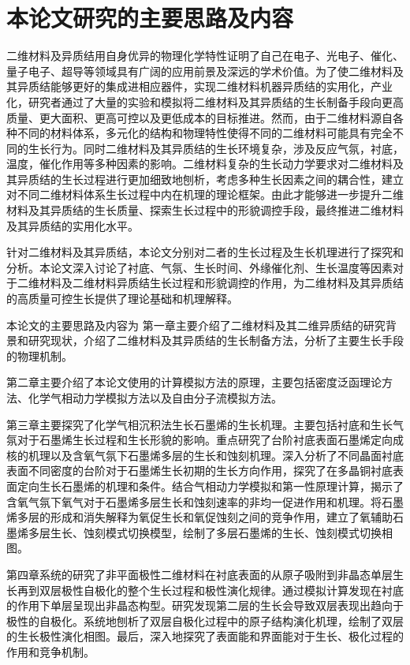 \section{本论文研究的主要思路及内容}
    二维材料及异质结用自身优异的物理化学特性证明了自己在电子、光电子、催化、量子电子、超导等领域具有广阔的应用前景及深远的学术价值。为了使二维材料及其异质结能够更好的集成进相应器件，实现二维材料机器异质结的实用化，产业化，研究者通过了大量的实验和模拟将二维材料及其异质结的生长制备手段向更高质量、更大面积、更高可控以及更低成本的目标推进。然而，由于二维材料源自各种不同的材料体系，多元化的结构和物理特性使得不同的二维材料可能具有完全不同的生长行为。同时二维材料及其异质结的生长环境复杂，涉及反应气氛，衬底，温度，催化作用等多种因素的影响。二维材料复杂的生长动力学要求对二维材料及其异质结的生长过程进行更加细致地刨析，考虑多种生长因素之间的耦合性，建立对不同二维材料体系生长过程中内在机理的理论框架。由此才能够进一步提升二维材料及其异质结的生长质量、探索生长过程中的形貌调控手段，最终推进二维材料及其异质结的实用化水平。

    针对二维材料及其异质结，本论文分别对二者的生长过程及生长机理进行了探究和分析。本论文深入讨论了衬底、气氛、生长时间、外缘催化剂、生长温度等因素对于二维材料及二维材料异质结生长过程和形貌调控的作用，为二维材料及其异质结的高质量可控生长提供了理论基础和机理解释。

    本论文的主要思路及内容为\chinesecolon
    第一章主要介绍了二维材料及其二维异质结的研究背景和研究现状，介绍了二维材料及其异质结的生长制备方法，分析了主要生长手段的物理机制。

    第二章主要介绍了本论文使用的计算模拟方法的原理，主要包括密度泛函理论方法、化学气相动力学模拟方法以及自由分子流模拟方法。

    第三章主要探究了化学气相沉积法生长石墨烯的生长机理。主要包括衬底和生长气氛对于石墨烯生长过程和生长形貌的影响。重点研究了台阶衬底表面石墨烯定向成核的机理以及含氧气氛下石墨烯多层的生长和蚀刻机理。深入分析了不同晶面衬底表面不同密度的台阶对于石墨烯生长初期的生长方向作用，探究了在多晶铜衬底表面定向生长石墨烯的机理和条件。结合气相动力学模拟和第一性原理计算，揭示了含氧气氛下氧气对于石墨烯多层生长和蚀刻速率的非均一促进作用和机理。将石墨烯多层的形成和消失解释为氧促生长和氧促蚀刻之间的竞争作用，建立了氧辅助石墨烯多层生长、蚀刻模式切换模型，绘制了多层石墨烯的生长、蚀刻模式切换相图。

    第四章系统的研究了非平面极性二维材料在衬底表面的从原子吸附到非晶态单层生长再到双层极性自极化的整个生长过程和极性演化规律。通过模拟计算发现在衬底的作用下单层呈现出非晶态构型。研究发现第二层的生长会导致双层表现出趋向于极性的自极化。系统地刨析了双层自极化过程中的原子结构演化机理，绘制了双层的生长极性演化相图。最后，深入地探究了表面能和界面能对于生长、极化过程的作用和竞争机制。

